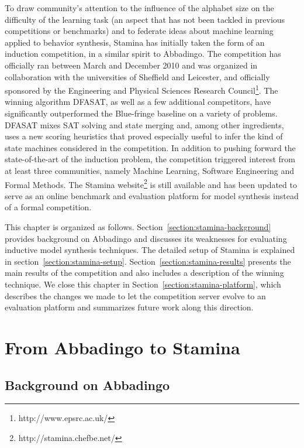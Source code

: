 To draw community's attention to the influence of the alphabet size on the difficulty of the learning task (an aspect that has not been tackled in previous competitions or benchmarks) and to federate ideas about machine learning applied to behavior synthesis, Stamina has initially taken the form of an induction competition, in a similar spirit to Abbadingo. The competition has officially ran between March and December 2010 and was organized in collaboration with the universities of Sheffield and Leicester, and officially sponsored by the Engineering and Physical Sciences Research Council\footnote{http://www.epsrc.ac.uk/}. The winning algorithm DFASAT, as well as a few additional competitors, have significantly outperformed the Blue-fringe baseline on a variety of problems. DFASAT mixes SAT solving and state merging and, among other ingredients, uses a new scoring heuristics that proved especially useful to infer the kind of state machines considered in the competition. In addition to pushing forward the state-of-the-art of the induction problem, the competition triggered interest from at least three communities, namely Machine Learning, Software Engineering and Formal Methods. The Stamina website\footnote{http://stamina.chefbe.net/} is still available and has been updated to serve as an online benchmark and evaluation platform for model synthesis instead of a formal competition.

This chapter is organized as follows. Section~\ref{section:stamina-background} provides background on Abbadingo and discusses its weaknesses for evaluating inductive model synthesis techniques. The detailed setup of Stamina is explained in section~\ref{section:stamina-setup}. Section~\ref{section:stamina-results} presents the main results of the competition and also includes a description of the winning technique. We close this chapter in Section~\ref{section:stamina-platform}, which describes the changes we made to let the competition server evolve to an evaluation platform and summarizes future work along this direction.

\section{From Abbadingo to Stamina\label{section:stamina-background}}

\subsection{Background on Abbadingo\label{subsection:stamina-abbadingo}}


